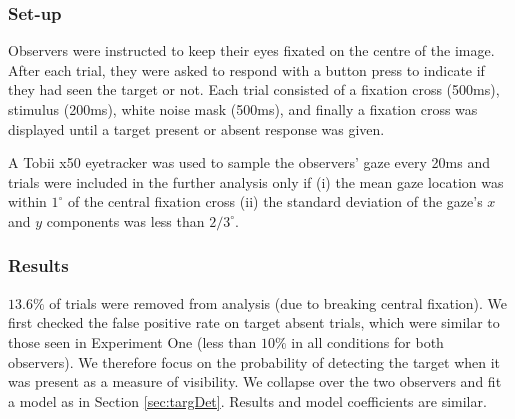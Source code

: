 \documentclass[preprint, authoryear]{elsarticle} %
\begin{document}
\subsubsection{Set-up}

Observers were instructed to keep their eyes fixated on the centre of the image. After each trial, they were asked to respond with a button press to indicate if they had seen the target or not.  Each trial consisted of a fixation cross (500ms), stimulus (200ms), white noise mask (500ms), and finally a fixation cross was displayed until a target present or absent response was given. 
\par
A Tobii x50 eyetracker was used to sample the observers' gaze every 20ms and trials were included in the further analysis only if (i) the mean gaze location was within $1^{\circ}$ of the central fixation cross (ii) the standard deviation of the gaze's $x$ and $y$ components was less than $2/3^{\circ}$.

\subsubsection{Results}

$13.6\%$ of trials were removed from analysis (due to breaking central fixation). 
We first checked the false positive rate on target absent trials, which were similar to those seen in Experiment One (less than $10\%$ in all conditions for both observers). We therefore focus on the probability of detecting the target when it was present as a measure of visibility. We collapse over the two observers and fit a model as in Section \ref{sec:targDet}. Results and model coefficients are similar. 


\end{document}

